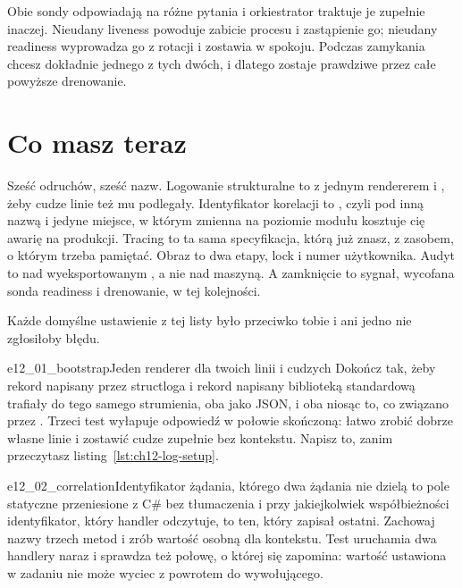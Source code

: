 
\noindent
Obie sondy odpowiadają na różne pytania i orkiestrator traktuje je zupełnie
inaczej. Nieudany liveness powoduje zabicie procesu i zastąpienie go;
nieudany readiness wyprowadza go z rotacji i zostawia w spokoju. Podczas
zamykania chcesz dokładnie jednego z tych dwóch, i dlatego 
zostaje prawdziwe przez całe powyższe drenowanie.

\section{Co masz teraz}
\label{sec:ch12-summary}

Sześć odruchów, sześć nazw. Logowanie strukturalne to  z
jednym rendererem i , żeby cudze linie też mu
podlegały. Identyfikator korelacji to , czyli
 pod inną nazwą i jedyne miejsce, w którym zmienna na
poziomie modułu kosztuje cię awarię na produkcji. Tracing to ta sama
specyfikacja, którą już znasz, z zasobem, o którym trzeba pamiętać. Obraz to
dwa etapy, lock i numer użytkownika. Audyt to  nad
wyeksportowanym , a nie nad maszyną. A zamknięcie to
sygnał, wycofana sonda readiness i drenowanie, w tej kolejności.

Każde domyślne ustawienie z tej listy było przeciwko tobie i ani jedno nie
zgłosiłoby błędu.

\begin{exercise}{e12_01_bootstrap}{Jeden renderer dla twoich linii i cudzych}
Dokończ  tak, żeby rekord napisany przez structloga
i rekord napisany biblioteką standardową trafiały do tego samego strumienia,
oba jako JSON, i oba niosąc to, co związano przez .
Trzeci test wyłapuje odpowiedź w połowie skończoną: łatwo zrobić dobrze
własne linie i zostawić cudze zupełnie bez kontekstu. Napisz to, zanim
przeczytasz listing~\ref{lst:ch12-log-setup}.
\end{exercise}

\begin{exercise}{e12_02_correlation}{Identyfikator żądania, którego dwa żądania nie dzielą}
 to pole statyczne przeniesione z C\# bez tłumaczenia i
przy jakiejkolwiek współbieżności identyfikator, który handler odczytuje, to
ten, który zapisał ostatni. Zachowaj nazwy trzech metod i zrób wartość
osobną dla kontekstu. Test uruchamia dwa handlery naraz i sprawdza też
połowę, o której się zapomina: wartość ustawiona w zadaniu nie może wyciec
z powrotem do wywołującego.
\end{exercise}

